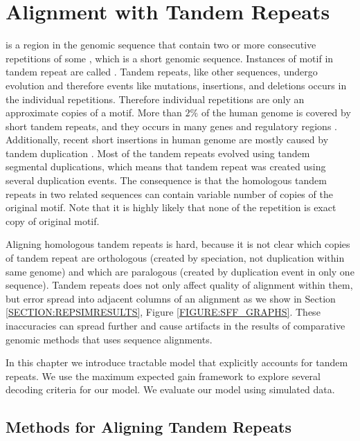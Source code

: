 \chapter{Alignment with Tandem Repeats} \label{CHAPTER:REP}
 is a region in the genomic sequence that contain two
or more consecutive repetitions of some , which is a short
genomic sequence. Instances of motif in tandem repeat are called
.  Tandem repeats, like other sequences, undergo
evolution and therefore events like mutations, insertions, and deletions
occurs in the individual repetitions.  Therefore individual repetitions are only an approximate copies of a motif.
More than $2\%$ of the human genome is covered by short
tandem repeats, and they occurs in many genes and regulatory regions
\cite{Gemayel2010}. Additionally, recent short insertions in human genome are
mostly caused by tandem duplication \cite{Messer2007}. Most of the tandem
repeats evolved using tandem segmental duplications, which means that tandem
repeat was created using several duplication events. The consequence is that
the homologous tandem repeats in two related sequences can contain variable
number of copies of the original motif. Note that it is highly likely that none
of the repetition is exact copy of original motif.

Aligning homologous tandem repeats is hard, because it is not clear which
copies of tandem repeat are orthologous (created by speciation, not duplication
within same genome) and which are paralogous (created by duplication event in
only one sequence). Tandem repeats does not only affect quality of alignment
within them, but error spread into adjacent columns of an alignment as we show
in Section \ref{SECTION:REPSIMRESULTS}, Figure \ref{FIGURE:SFF_GRAPHS}.  These
inaccuracies can spread further and cause artifacts in the results of
comparative genomic methods that uses sequence alignments.

In this chapter we introduce tractable model that explicitly accounts for
tandem repeats. We use the maximum expected gain framework to explore several
decoding criteria for our model. We evaluate our model using simulated data. 

\section{Methods for Aligning Tandem Repeats}\label{SECTION:REPALNMETHODS}

